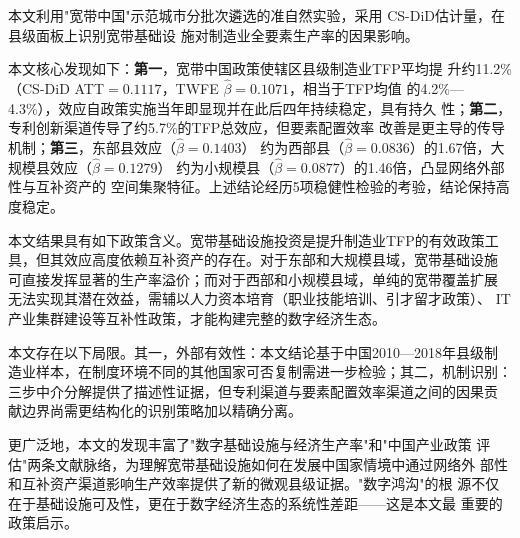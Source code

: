 \documentclass[12pt, a4paper]{article}
\begin{document}
本文利用"宽带中国"示范城市分批次遴选的准自然实验，采用
\citet{callaway2021difference} CS-DiD估计量，在县级面板上识别宽带基础设
施对制造业全要素生产率的因果影响。

本文核心发现如下：\textbf{第一}，宽带中国政策使辖区县级制造业TFP平均提
升约11.2\%（CS-DiD ATT$=0.1117$，TWFE $\hat\beta=0.1071$，相当于TFP均值
的4.2\%—4.3\%），效应自政策实施当年即显现并在此后四年持续稳定，具有持久
性；\textbf{第二}，专利创新渠道传导了约5.7\%的TFP总效应，但要素配置效率
改善是更主导的传导机制；\textbf{第三}，东部县效应（$\hat\beta=0.1403$）
约为西部县（$\hat\beta=0.0836$）的1.67倍，大规模县效应（$\hat\beta=0.1279$）
约为小规模县（$\hat\beta=0.0877$）的1.46倍，凸显网络外部性与互补资产的
空间集聚特征。上述结论经历5项稳健性检验的考验，结论保持高度稳定。

本文结果具有如下政策含义。宽带基础设施投资是提升制造业TFP的有效政策工
具，但其效应高度依赖互补资产的存在。对于东部和大规模县域，宽带基础设施
可直接发挥显著的生产率溢价；而对于西部和小规模县域，单纯的宽带覆盖扩展
无法实现其潜在效益，需辅以人力资本培育（职业技能培训、引才留才政策）、
IT产业集群建设等互补性政策，才能构建完整的数字经济生态。

本文存在以下局限。其一，外部有效性：本文结论基于中国2010—2018年县级制
造业样本，在制度环境不同的其他国家可否复制需进一步检验；其二，机制识别：
三步中介分解提供了描述性证据，但专利渠道与要素配置效率渠道之间的因果贡
献边界尚需更结构化的识别策略加以精确分离。

更广泛地，本文的发现丰富了"数字基础设施与经济生产率"和"中国产业政策
评估"两条文献脉络，为理解宽带基础设施如何在发展中国家情境中通过网络外
部性和互补资产渠道影响生产效率提供了新的微观县级证据。"数字鸿沟"的根
源不仅在于基础设施可及性，更在于数字经济生态的系统性差距——这是本文最
重要的政策启示。
\end{document}
